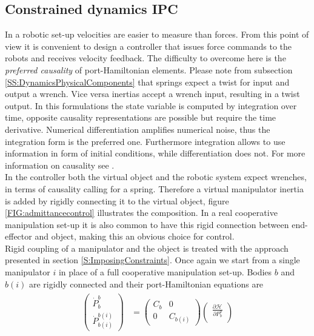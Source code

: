 \documentclass[a4paper,twoside, openright,12pt]{report}
\begin{document}
{\subsection{Constrained dynamics IPC}\label{SS:constrainedDIPC}
In a robotic set-up velocities are easier to measure than forces. From this point of view it is convenient to design a controller that issues force commands to the robots and receives velocity feedback. The difficulty to overcome here is the \emph{preferred causality} of port-Hamiltonian elements. Please note from subsection \ref{SS:DynamicsPhysicalComponents} that springs expect a twist for input and output a wrench. Vice versa inertias accept a wrench input, resulting in a twist output. In this formulations the state variable is computed by integration over time, opposite causality representations are possible but require the time derivative. Numerical differentiation amplifies numerical noise, thus the integration form is the preferred one. Furthermore integration allows to use information in form of initial conditions, while differentiation does not. For more information on causality see \cite{duindam2009geoplexbook}.\\
 In the controller both the virtual object and the robotic system expect wrenches, in terms of causality calling for a spring. Therefore a virtual manipulator inertia is added by rigidly connecting it to the virtual object, figure \ref{FIG:admittancecontrol} illustrates the composition. In a real cooperative manipulation set-up it is also  common to  have this rigid connection between end-effector and object, making this an obvious choice for control. \\
Rigid coupling of a manipulator and the object is treated with the approach presented in section \ref{S:ImposingConstraints}. Once again we start from a single manipulator $i$ in place of a full cooperative manipulation set-up. Bodies $b$ and $b(i)$ are rigidly connected and their port-Hamiltonian equations are
\begin{eqnarray}
\begin{aligned}
\begin{pmatrix}
\dot{P}_b^b \\ \dot{P}_{b(i)}^{b(i)}
\end{pmatrix}
&=
\begin{pmatrix}
C_b & 0 \\ 0 & C_{b(i)} 
\end{pmatrix}
\begin{pmatrix} \frac{\partial \mathcal{H}}{\partial P_b^b} \\ 

\end{pmatrix}
\end{aligned}
\end{eqnarray}}
\end{document}
